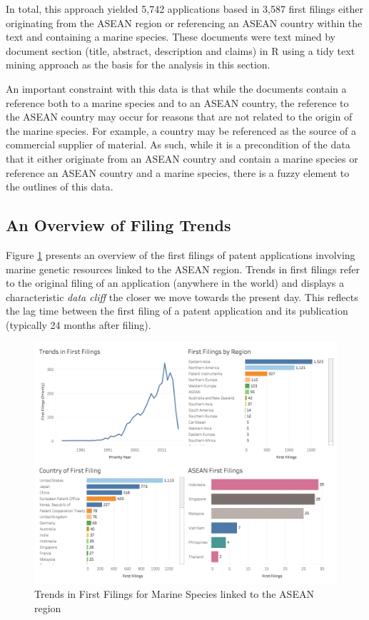 \documentclass[openany]{book}
\theoremstyle{definition}
\theoremstyle{definition}
\theoremstyle{definition}
\theoremstyle{remark}
\begin{document}
In total, this approach yielded 5,742 applications based in 3,587 first
filings either originating from the ASEAN region or referencing an ASEAN
country within the text and containing a marine species. These documents
were text mined by document section (title, abstract, description and
claims) in R using a tidy text mining approach as the basis for the
analysis in this section.

An important constraint with this data is that while the documents
contain a reference both to a marine species and to an ASEAN country,
the reference to the ASEAN country may occur for reasons that are not
related to the origin of the marine species. For example, a country may
be referenced as the source of a commercial supplier of material. As
such, while it is a precondition of the data that it either originate
from an ASEAN country and contain a marine species or reference an ASEAN
country and a marine species, there is a fuzzy element to the outlines
of this data.

\hypertarget{an-overview-of-filing-trends}{%
\subsection{An Overview of Filing
Trends}\label{an-overview-of-filing-trends}}

Figure \ref{fig:firstfilings} presents an overview of the first filings
of patent applications involving marine genetic resources linked to the
ASEAN region. Trends in first filings refer to the original filing of an
application (anywhere in the world) and displays a characteristic
\emph{data cliff} the closer we move towards the present day. This
reflects the lag time between the first filing of a patent application
and its publication (typically 24 months after filing).

\begin{figure}

{\centering \includegraphics[width=1\linewidth]{images-patents/first_filings} 

}

\caption{Trends in First Filings for Marine Species linked to the ASEAN region}\label{fig:firstfilings}
\end{figure}
\end{document}
